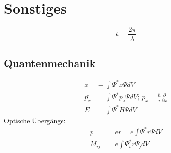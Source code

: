 \section{Sonstiges}
\begin{equation*}
    k = \frac{2 \pi}{\lambda}
\end{equation*}

\subsection*{Quantenmechanik}
\begin{equation*}
    \begin{aligned}
        \bar{x} &= \int \Psi^* x \Psi dV \\
        \bar{p_x} &= \int \Psi^* p_x \Psi dV; \; p_x = \frac{\hbar}{i} \frac{\partial }{\partial x} \\
        \bar{E} &= \int \Psi^* H \Psi dV 
    \end{aligned}
\end{equation*}
Optische Übergänge:
\begin{equation*}
    \begin{aligned}
        \bar{p} &= e \bar{r} = e \int \Psi^* r \Psi dV \\
        M_{ij} &= e \int \Psi_i^* r \Psi_j dV 
    \end{aligned}
\end{equation*}